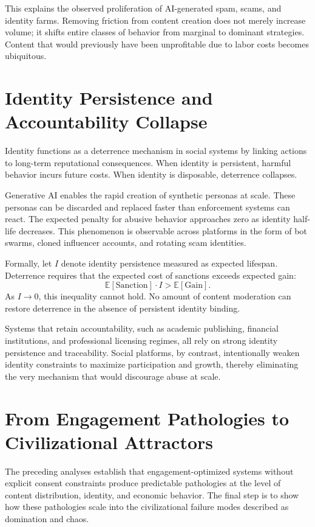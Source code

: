 \documentclass[11pt,oneside]{article}
\begin{document}
This explains the observed proliferation of AI-generated spam, scams, and identity farms. Removing friction from content creation does not merely increase volume; it shifts entire classes of behavior from marginal to dominant strategies. Content that would previously have been unprofitable due to labor costs becomes ubiquitous.

\section{Identity Persistence and Accountability Collapse}

Identity functions as a deterrence mechanism in social systems by linking actions to long-term reputational consequences. When identity is persistent, harmful behavior incurs future costs. When identity is disposable, deterrence collapses.

Generative AI enables the rapid creation of synthetic personas at scale. These personas can be discarded and replaced faster than enforcement systems can react. The expected penalty for abusive behavior approaches zero as identity half-life decreases. This phenomenon is observable across platforms in the form of bot swarms, cloned influencer accounts, and rotating scam identities.

Formally, let \( I \) denote identity persistence measured as expected lifespan. Deterrence requires that the expected cost of sanctions exceeds expected gain:
\[
\mathbb{E}[\text{Sanction}] \cdot I > \mathbb{E}[\text{Gain}].
\]
As \( I \to 0 \), this inequality cannot hold. No amount of content moderation can restore deterrence in the absence of persistent identity binding.

Systems that retain accountability, such as academic publishing, financial institutions, and professional licensing regimes, all rely on strong identity persistence and traceability. Social platforms, by contrast, intentionally weaken identity constraints to maximize participation and growth, thereby eliminating the very mechanism that would discourage abuse at scale.

\section{From Engagement Pathologies to Civilizational Attractors}

The preceding analyses establish that engagement-optimized systems without explicit consent constraints produce predictable pathologies at the level of content distribution, identity, and economic behavior. The final step is to show how these pathologies scale into the civilizational failure modes described as domination and chaos.
\end{document}
